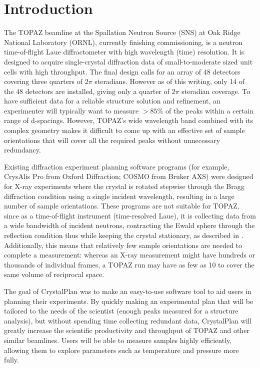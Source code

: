 \documentclass[final]{iucr}              %
\begin{document}
\section{Introduction}

The TOPAZ beamline at the Spallation Neutron Source (SNS) at Oak Ridge National
Laboratory (ORNL), currently finishing commissioning, is a neutron
time-of-flight Laue diffractometer with high wavelength (time) resolution. It
is designed to acquire single-crystal diffraction data of small-to-moderate sized unit cells with  high
throughput. The final design calls for an array of 48 detectors covering three
quarters of $2\pi$ steradians. However as of this writing, only 14 of the 48
detectors are installed, giving only a quarter of $2\pi$ steradian coverage. 
To have sufficient data for a reliable structure solution and
refinement, an experimenter will typically want to measure $ > 85\%$ of the
peaks within a certain range of d-spacings. However, TOPAZ's wide wavelength
band combined with its complex geometry makes it difficult to come up with
an effective set of sample orientations that will cover all the required peaks
without unnecessary redundancy.   


Existing diffraction experiment planning software programs (for example,
CrysAlis Pro from Oxford Diffraction; COSMO from Bruker AXS) were designed for
X-ray experiments where the crystal is rotated stepwise through the Bragg
diffraction condition using a single incident wavelength, 
resulting in a large number of sample orientations.
These programs are not suitable for TOPAZ, since as a time-of-flight instrument
(time-resolved Laue), it is collecting data from a wide
bandwidth of incident neutrons, contracting the Ewald sphere through the
reflection condition thus while keeping the crystal stationary, as described in
\cite{Schultz94,Wilson00}.
 Additionally, this means that relatively few sample
orientations are needed to complete a measurement: whereas an X-ray measurement might have
hundreds or thousands of individual frames, a TOPAZ run may have as few as 10
to cover the same volume of reciprocal space.


The goal of CrystalPlan was to make an easy-to-use software tool to aid users in
planning their experiments. By quickly making an experimental plan that will be
tailored to the needs of the scientist (enough peaks measured for a structure
analysis), but without spending time collecting redundant data, CrystalPlan will
greatly increase the scientific productivity and throughput of TOPAZ and other
similar beamlines. Users will be able to measure samples highly efficiently,
allowing them to explore parameters such as temperature and pressure more fully.
 
\end{document}
